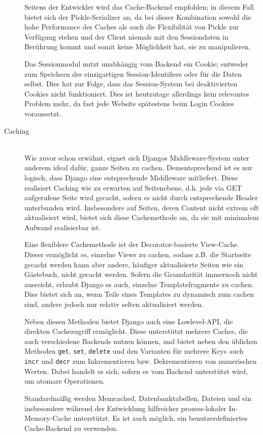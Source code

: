 \begin{description}
Seitens der Entwickler wird das Cache-Backend empfohlen; in diesem Fall bietet sich der
Pickle-Serializer an, da bei dieser Kombination sowohl die hohe Performance des Caches als auch die
Flexibilität von Pickle zur Verfügung stehen und der Client niemals mit den Sessiondaten in
Berührung kommt und somit keine Möglichkeit hat, sie zu manipulieren.

Das Sessionmodul nutzt unabhängig vom Backend ein Cookie; entweder zum Speichern des einzigartigen
Session-Identifiers oder für die Daten selbst. Dies hat zur Folge, dass das Session-System bei
deaktivierten Cookies nicht funktioniert. Dies ist heutzutage allerdings kein relevantes Problem
mehr, da fast jede Website spätestens beim Login Cookies voraussetzt.


\item[Caching] \hfill \\
Wie zuvor schon erwähnt, eignet sich Djangos Middleware-System unter anderem ideal dafür, ganze
Seiten zu cachen. Dementsprechend ist es nur logisch, dass Django eine entsprechende Middleware
mitliefert.  Diese realisiert Caching wie zu erwarten auf Seitenebene, d.h. jede via GET aufgerufene
Seite wird gecacht, sofern es nicht durch entsprechende Header unterbunden wird. Insbesondere auf
Seiten, deren Content nicht extrem oft aktualisiert wird, bietet sich diese Cachemethode an, da sie
mit minimalem Aufwand realisierbar ist.

Eine flexiblere Cachemethode ist der Decorator-basierte View-Cache. Dieser ermöglicht es, einzelne
Views zu cachen, sodass z.B. die Startseite gecacht werden kann aber andere, häufiger
aktualisierte Seiten wie ein Gästebuch, nicht gecacht werden. Sofern die Granularität
immernoch nicht ausreicht, erlaubt Django es auch, einzelne Templatefragmente zu cachen. Dies bietet
sich an, wenn Teile eines Templates zu dynamisch zum cachen sind, andere jedoch nur relativ selten
aktualisiert werden.

Neben diesen Methoden bietet Django auch eine Lowlevel-API, die direkten Cachezugriff ermöglicht.
Diese unterstützt mehrere Caches, die auch verschiedene Backends nutzen können, und bietet neben den
üblichen Methoden \lstinline{get}, \lstinline{set}, \lstinline{delete} und den Varianten für mehrere
Keys auch \lstinline{incr} und \lstinline{decr} zum Inkrementieren bzw. Dekrementieren von
numerischen Werten. Dabei handelt es sich, sofern es vom Backend unterstützt wird, um atomare
Operationen.

Standardmäßig werden Memcached, Datenbanktabellen, Dateien und ein insbesondere während der
Entwicklung hilfreicher prozess-lokaler In-Memory-Cache unterstützt. Es ist auch möglich, ein
benutzerdefiniertes Cache-Backend zu verwenden.
\newpage


\end{description}
